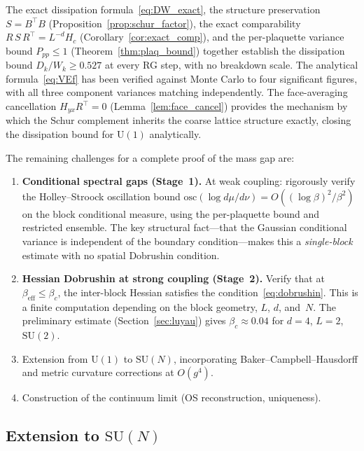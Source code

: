 \documentclass[11pt]{article}
\theoremstyle{definition}
\begin{document}
The exact dissipation formula~\eqref{eq:DW_exact}, the structure 
preservation $S = B^\top B$ (Proposition~\ref{prop:schur_factor}), 
the exact comparability $R\,S\,R^\top = L^{-d} H_c$ 
(Corollary~\ref{cor:exact_comp}), and the per-plaquette variance 
bound $P_{pp} \leq 1$ (Theorem~\ref{thm:plaq_bound}) together 
establish the dissipation bound $D_k/W_k \geq 0.527$ at every 
RG step, with no breakdown scale.  The analytical 
formula~\eqref{eq:VEf} has been verified against Monte Carlo to four 
significant figures, with all three component variances matching 
independently.  The face-averaging cancellation 
$H_{yx}R^\top = 0$ (Lemma~\ref{lem:face_cancel}) provides the mechanism 
by which the Schur complement inherits the coarse lattice structure exactly, 
closing the dissipation bound for $\mathrm{U}(1)$ analytically.

The remaining challenges for a complete proof of the mass gap are:
\begin{enumerate}
\item \textbf{Conditional spectral gaps (Stage~1).}  
  At weak coupling: rigorously verify the Holley--Stroock oscillation 
  bound $\mathrm{osc}(\log d\mu/d\nu) = O((\log\beta)^2/\beta^2)$ 
  on the block conditional measure, using the per-plaquette bound 
  and restricted ensemble.  The key structural fact---that the 
  Gaussian conditional variance is independent of the boundary 
  condition---makes this a \emph{single-block} estimate with no 
  spatial Dobrushin condition.
\item \textbf{Hessian Dobrushin at strong coupling (Stage~2).}  
  Verify that at $\beta_{\mathrm{eff}} \leq \beta_c$, the 
  inter-block Hessian satisfies the 
  condition~\eqref{eq:dobrushin}.  This is a finite computation 
  depending on the block geometry, $L$, $d$, and~$N$.  The 
  preliminary estimate (Section~\ref{sec:luyau}) gives 
  $\beta_c \approx 0.04$ for $d=4$, $L=2$, $\mathrm{SU}(2)$.
\item Extension from $\mathrm{U}(1)$ to $\mathrm{SU}(N)$, incorporating 
  Baker--Campbell--Hausdorff and metric curvature corrections at 
  $O(g^4)$.
\item Construction of the continuum limit (OS reconstruction, 
  uniqueness).
\end{enumerate}

\subsection{Extension to $\mathrm{SU}(N)$}
\end{document}

